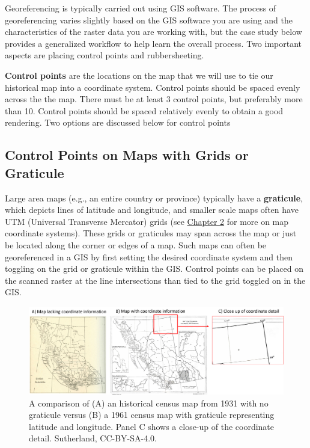 \documentclass[
]{book}
\begin{document}
Georeferencing is typically carried out using GIS software. The process of georeferencing varies slightly based on the GIS software you are using and the characteristics of the raster data you are working with, but the case study below provides a generalized workflow to help learn the overall process. Two important aspects are placing control points and rubbersheeting.

\textbf{Control points} are the locations on the map that we will use to tie our historical map into a coordinate system. Control points should be spaced evenly across the the map. There must be at least 3 control points, but preferably more than 10. Control points should be spaced relatively evenly to obtain a good rendering. Two options are discussed below for control points

\subsection{Control Points on Maps with Grids or Graticule}\label{control-points-on-maps-with-grids-or-graticule}

Large area maps (e.g., an entire country or province) typically have a \textbf{graticule}, which depicts lines of latitude and longitude, and smaller scale maps often have UTM (Universal Transverse Mercator) grids (see \href{https://www.opengeomatics.ca/mapping-data.html}{Chapter 2} for more on map coordinate systems). These grids or graticules may span across the map or just be located along the corner or edges of a map. Such maps can often be georeferenced in a GIS by first setting the desired coordinate system and then toggling on the grid or graticule within the GIS. Control points can be placed on the scanned raster at the line intersections than tied to the grid toggled on in the GIS.

\begin{figure}
\includegraphics[width=0.75\linewidth]{images/04-control-points} \caption{A comparison of (A) an historical census map from 1931 with no graticule versus (B) a 1961 census map with graticule representing latitude and longitude. Panel C shows a close-up of the coordinate detail. Sutherland, CC-BY-SA-4.0.}\label{fig:4-control-points}
\end{figure}
\end{document}
